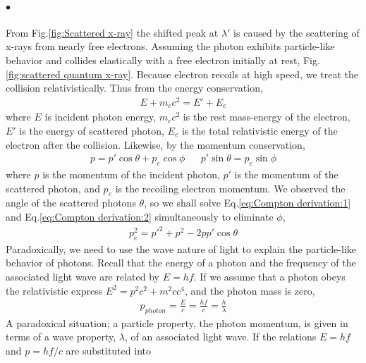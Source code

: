    \paragraph{$\bullet$}  From Fig.\eqref{fig:Scattered x-ray} the shifted peak at $\lambda'$ is caused by the scattering of 
    x-rays from nearly free electrons. Assuming the photon exhibits particle-like behavior and collides elastically with a free
    electron initially at rest, Fig.\eqref{fig:scattered quantum x-ray}. Because electron recoils at high speed, we treat the
    collision relativistically. Thus from the energy conservation, 
    \begin{align}
        \label{eq:Compton derivation:1}
        E + m_ec^2 = E' + E_e
    \end{align}
    where $E$ is incident photon energy, $m_ec^2$ is the rest mass-energy of the electron, $E'$ is the energy of scattered
    photon, $E_e$ is the total relativistic energy of the electron after the collision. Likewise, by the momentum conservation, 
    \begin{align}
        \label{eq:Compton derivation:2}
        p  = p' \cos{\theta} + p_e \cos{\phi} &&
        p' \sin{\theta} = p_e \sin{\phi}
    \end{align}
    where $p$ is the momentum of the incident photon, $p'$ is the momentum of the scattered photon, and $p_e$ 
    is the recoiling electron momentum. We observed the angle of the scattered photons $\theta$, so we shall solve
    Eq.\eqref{eq:Compton derivation:1} and Eq.\eqref{eq:Compton derivation:2} simultaneously to eliminate $\phi$,
    \begin{align}
        \label{eq:Compton derivation:3}
        p_e^2 = p'^2 + p^2 - 2p p' \cos{\theta}
    \end{align}
    Paradoxically, we need to use the wave nature of light to explain the particle-like behavior 
    of photons. Recall that the energy of a photon and the frequency of the associated light wave are related 
    by $E=hf$. If we assume that a photon obeys the relativistic express $E^2 = p^2c^2 + m^2c c^4$, and the photon mass is zero, 
    \begin{align}
        \label{eq:Compton derivation:4}
        p_{photon} = \frac{E}{c} = \frac{hf}{c} = \frac{h}{\lambda}
    \end{align}
    A paradoxical situation; a particle property, the photon momentum, is given in terms of a wave property, $\lambda$, of 
    an associated light wave. If the relations $E = hf$ and $p = hf/c$ are substituted into 
